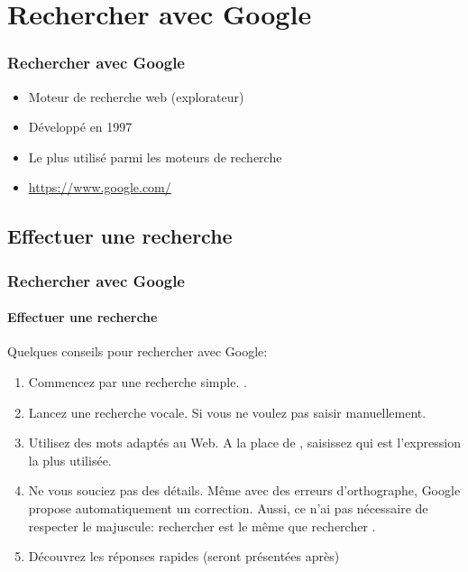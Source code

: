 \documentclass[xcolor=table]{beamer}
\begin{document}
\section{Rechercher avec Google}

\begin{frame}
\frametitle{Rechercher avec Google}

\begin{itemize}
	\item Moteur de recherche web (explorateur)
	\item Développé en 1997
	\item Le plus utilisé parmi les moteurs de recherche
	\item \url{https://www.google.com/}
\end{itemize}

\end{frame}

\subsection{Effectuer une recherche}

\begin{frame}
\frametitle{Rechercher avec Google}
\framesubtitle{Effectuer une recherche}

Quelques conseils pour rechercher avec Google: 
\begin{enumerate}
	\item Commencez par une recherche simple. .
	
	\item Lancez une recherche vocale. Si vous ne voulez pas saisir manuellement.
	
	\item Utilisez des mots adaptés au Web. A la place de , saisissez  qui est l'expression la plus utilisée.
	
	\item Ne vous souciez pas des détails. Même avec des erreurs d'orthographe, Google propose automatiquement un correction. Aussi, ce n'ai pas nécessaire de respecter le majuscule: rechercher  est le même que rechercher .
	
	\item Découvrez les réponses rapides (seront présentées après)
\end{enumerate}

\end{frame}
\end{document}
